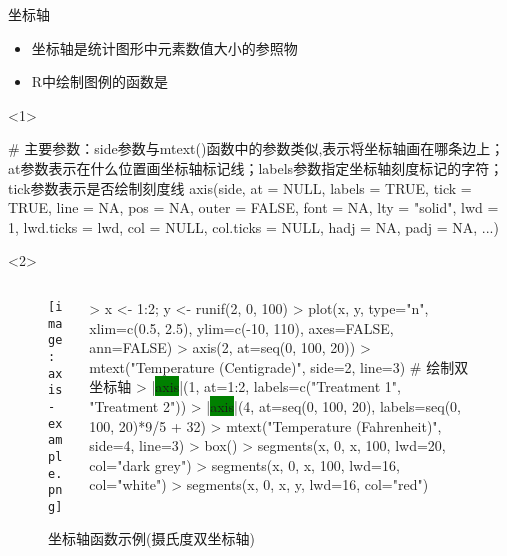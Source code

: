 \begin{frame}[t,fragile]{\subsecname}{坐标轴}
\begin{itemize}
\item 坐标轴是统计图形中元素数值大小的参照物
\item R中绘制图例的函数是
\end{itemize}

\begin{onlyenv}<1>
\begin{rcode}
# 主要参数：side参数与mtext()函数中的参数类似,表示将坐标轴画在哪条边上；at参数表示在什么位置画坐标轴标记线；labels参数指定坐标轴刻度标记的字符；tick参数表示是否绘制刻度线
axis(side, at = NULL, labels = TRUE, tick = TRUE, line = NA, pos = NA, outer = FALSE, font = NA, lty = "solid", lwd = 1, lwd.ticks = lwd, col = NULL, col.ticks = NULL, hadj = NA, padj = NA, ...)
\end{rcode}
\end{onlyenv}  

\begin{onlyenv}<2>
\begin{figure}
 \begin{columns}
    \begin{column}[c]{.4\textwidth}
        \texttt{[image: axis-example.png]}
    \end{column}

    \begin{column}[c]{.6\textwidth}
\begin{rcode}
> x <- 1:2; y <- runif(2, 0, 100)
> plot(x, y, type="n", xlim=c(0.5, 2.5), ylim=c(-10, 110), axes=FALSE, ann=FALSE)
> axis(2, at=seq(0, 100, 20))
> mtext("Temperature (Centigrade)", side=2, line=3)
# 绘制双坐标轴
> |\colorbox{green}{axis}|(1, at=1:2, labels=c("Treatment 1", "Treatment 2"))
> |\colorbox{green}{axis}|(4, at=seq(0, 100, 20), labels=seq(0, 100, 20)*9/5 + 32)
> mtext("Temperature (Fahrenheit)", side=4, line=3)
> box()
> segments(x, 0, x, 100, lwd=20, col="dark grey")
> segments(x, 0, x, 100, lwd=16, col="white")
> segments(x, 0, x, y, lwd=16, col="red")
\end{rcode}
    \end{column}
  \end{columns}
  \caption{坐标轴函数示例(摄氏度双坐标轴)}
\end{figure}
\end{onlyenv}
\end{frame}

